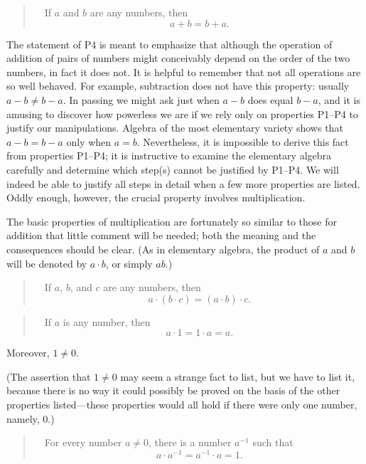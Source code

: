 \begin{quote}
\ \ If $a$ and $b$ are any numbers, then
\[ a + b = b + a. \]
\end{quote}

The statement of P4 is meant to emphasize that although the operation of
addition of pairs of numbers might conceivably depend on the order of the two
numbers, in fact it does not. It is helpful to remember that not all
operations are so well behaved. For example, subtraction does not have this
property: usually $a-b \neq b-a$. In passing we might ask just when $a-b$ does
equal $b-a$, and it is amusing to discover how powerless we are if we rely
only on properties P1--P4 to justify our manipulations. Algebra of the most
elementary variety shows that $a-b=b-a$ only when $a=b$. Nevertheless, it is
impossible to derive this fact from properties P1--P4; it is instructive to
examine the elementary algebra carefully and determine which step(s) cannot
be justified by P1--P4. We will indeed be able to justify all steps in detail
when a few more properties are listed. Oddly enough, however, the crucial
property involves multiplication.

The basic properties of multiplication are fortunately so similar to those
for addition that little comment will be needed; both the meaning and the
consequences should be clear. (As in elementary algebra, the product of $a$
and $b$ will be denoted by $a \cdot b$, or simply $ab$.)

\begin{quote}
\ \ If $a$, $b$, and $c$ are any numbers, then
\[ a \cdot (b \cdot c) = (a \cdot b) \cdot c. \]
\end{quote}

\begin{quote}
\ \ If $a$ is any number, then
\[ a \cdot 1 = 1 \cdot a = a. \]
\end{quote}

Moreover, $1 \neq 0$.

(The assertion that $1 \neq 0$ may seem a strange fact to list, but we have
to list it, because there is no way it could possibly be proved on the basis
of the other properties listed---these properties would all hold if there
were only one number, namely, $0$.)

\begin{quote}
\ \ For every number $a \neq 0$, there is a number $a^{-1}$ such that
\[ a \cdot a^{-1} = a^{-1} \cdot a = 1. \]
\end{quote}

